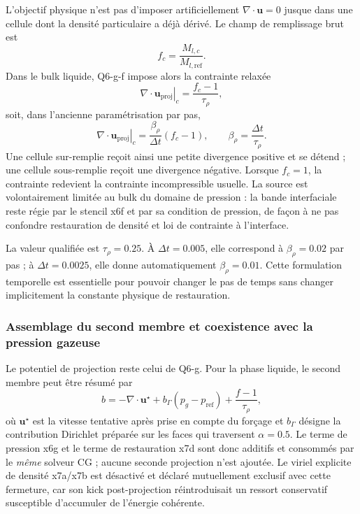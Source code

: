 \documentclass[11pt,a4paper]{article}
\begin{document}
L'objectif physique n'est pas d'imposer artificiellement $\nabla\!\cdot\bm u=0$ jusque dans une cellule dont la densité particulaire a déjà dérivé. Le champ de remplissage brut est
\begin{equation}
  f_c=\frac{M_{l,c}}{M_{l,\mathrm{ref}}}.
\end{equation}
Dans le bulk liquide, Q6-g-f impose alors la contrainte relaxée
\begin{equation}
  \left.\nabla\!\cdot\bm u_{\mathrm{proj}}\right|_c
  =\frac{f_c-1}{\tau_\rho},
  \label{eq:q6gf-density-target}
\end{equation}
soit, dans l'ancienne paramétrisation par pas,
\begin{equation}
  \left.\nabla\!\cdot\bm u_{\mathrm{proj}}\right|_c
  =\frac{\beta_\rho}{\Delta t}(f_c-1),
  \qquad
  \beta_\rho=\frac{\Delta t}{\tau_\rho}.
\end{equation}
Une cellule sur-remplie reçoit ainsi une petite divergence positive et se détend ; une cellule sous-remplie reçoit une divergence négative. Lorsque $f_c=1$, la contrainte redevient la contrainte incompressible usuelle. La source est volontairement limitée au bulk du domaine de pression : la bande interfaciale reste régie par le stencil x6f et par sa condition de pression, de façon à ne pas confondre restauration de densité et loi de contrainte à l'interface.

La valeur qualifiée est $\tau_\rho=0.25$. À $\Delta t=0.005$, elle correspond à $\beta_\rho=0.02$ par pas ; à $\Delta t=0.0025$, elle donne automatiquement $\beta_\rho=0.01$. Cette formulation temporelle est essentielle pour pouvoir changer le pas de temps sans changer implicitement la constante physique de restauration.

\subsubsection{Assemblage du second membre et coexistence avec la pression gazeuse}

Le potentiel de projection reste celui de Q6-g. Pour la phase liquide, le second membre peut être résumé par
\begin{equation}
  b=-\nabla\!\cdot\bm u^{\star}
    +b_{\Gamma}(p_g-p_{\mathrm{ref}})
    +\frac{f-1}{\tau_\rho},
  \label{eq:q6gf-rhs}
\end{equation}
où $\bm u^{\star}$ est la vitesse tentative après prise en compte du forçage et $b_{\Gamma}$ désigne la contribution Dirichlet préparée sur les faces qui traversent $\alpha=0.5$. Le terme de pression x6g et le terme de restauration x7d sont donc additifs et consommés par le \emph{même} solveur CG ; aucune seconde projection n'est ajoutée. Le viriel explicite de densité x7a/x7b est désactivé et déclaré mutuellement exclusif avec cette fermeture, car son kick post-projection réintroduisait un ressort conservatif susceptible d'accumuler de l'énergie cohérente.
\end{document}
